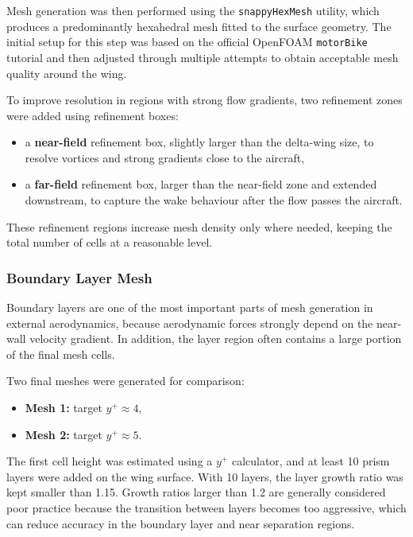 Mesh generation was then performed using the \texttt{snappyHexMesh} utility, which produces a predominantly hexahedral mesh fitted to the surface geometry. The initial setup for this step was based on the official OpenFOAM \texttt{motorBike} tutorial and then adjusted through multiple attempts to obtain acceptable mesh quality around the wing.

To improve resolution in regions with strong flow gradients, two refinement zones were added using refinement boxes:
\begin{itemize}
    \item a \textbf{near-field} refinement box, slightly larger than the delta-wing size, to resolve vortices and strong gradients close to the aircraft,
    \item a \textbf{far-field} refinement box, larger than the near-field zone and extended downstream, to capture the wake behaviour after the flow passes the aircraft.
\end{itemize}
These refinement regions increase mesh density only where needed, keeping the total number of cells at a reasonable level.

\subsubsection{Boundary Layer Mesh}
Boundary layers are one of the most important parts of mesh generation in external aerodynamics, because aerodynamic forces strongly depend on the near-wall velocity gradient. In addition, the layer region often contains a large portion of the final mesh cells.

Two final meshes were generated for comparison:
\begin{itemize}
    \item \textbf{Mesh 1:} target $y^+ \approx 4$,
    \item \textbf{Mesh 2:} target $y^+ \approx 5$.
\end{itemize}
The first cell height was estimated using a $y^+$ calculator, and at least 10 prism layers were added on the wing surface. With 10 layers, the layer growth ratio was kept smaller than 1.15. Growth ratios larger than 1.2 are generally considered poor practice because the transition between layers becomes too aggressive, which can reduce accuracy in the boundary layer and near separation regions.

